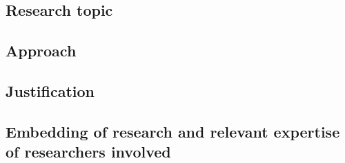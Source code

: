 \documentclass[a4paper,10pt,fleqn]{application}
\begin{document}
\subsection{Research topic}


\subsection{Approach}


\subsection{Justification}



\subsection{Embedding of research and relevant expertise of researchers involved}
\end{document}
